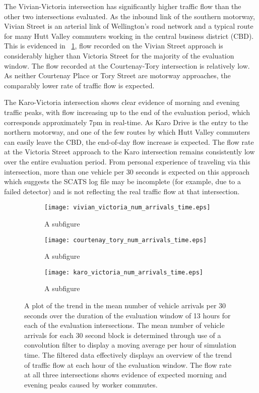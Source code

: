 The Vivian-Victoria intersection has significantly higher traffic flow than the other two intersections evaluated. As the inbound link of the southern motorway, Vivian Street is an arterial link of Wellington's road network and a typical route for many Hutt Valley commuters working in the central business district (CBD). This is evidenced in ~\ref{vehiclearrivalstime:sub1}, flow recorded on the Vivian Street approach is considerably higher than Victoria Street for the majority of the evaluation window. The flow recorded at the Courtenay-Tory intersection is relatively low. As neither Courtenay Place or Tory Street are motorway approaches, the comparably lower rate of traffic flow is expected. 

The Karo-Victoria intersection shows clear evidence of morning and evening traffic peaks, with flow increasing up to the end of the evaluation period, which corresponds approximately 7pm in real-time. As Karo Drive is the entry to the northern motorway, and one of the few routes by which Hutt Valley commuters can easily leave the CBD, the end-of-day flow increase is expected. The flow rate at the Victoria Street approach to the Karo intersection remains consistently low over the entire evaluation period. From personal experience of traveling via this intersection, more than one vehicle per 30 seconds is expected on this approach which suggests the SCATS log file may be incomplete (for example, due to a failed detector) and is not reflecting the real traffic flow at that intersection. 

\begin{figure}
\centering
\begin{subfigure}{.5\textwidth}
  \centering
  \texttt{[image: vivian\_victoria\_num\_arrivals\_time.eps]}
  \caption{A subfigure}
  \label{vehiclearrivalstime:sub1}
\end{subfigure}%
\begin{subfigure}{.5\textwidth}
  \centering
  \texttt{[image: courtenay\_tory\_num\_arrivals\_time.eps]}
  \caption{A subfigure}
  \label{vehiclearrivalstime:sub2}
\end{subfigure}

\vspace{1cm}

\begin{subfigure}{.5\textwidth}
  \centering
  \texttt{[image: karo\_victoria\_num\_arrivals\_time.eps]}
  \caption{A subfigure}
  \label{vehiclearrivalstime:sub3}
\end{subfigure}%
\caption{ A plot of the trend in the mean number of vehicle arrivals per 30 seconds over the duration of the evaluation window of 13 hours for each of the evaluation intersections. The mean number of vehicle arrivals for each 30 second block is determined through use of a convolution filter to display a moving average per hour of simulation time. The filtered data effectively displays an overview of the trend of traffic flow at each hour of the evaluation window. The flow rate at all three intersections shows evidence of expected morning and evening peaks caused by worker commutes. }
\label{eval:vehiclearrivalstime}
\end{figure}

